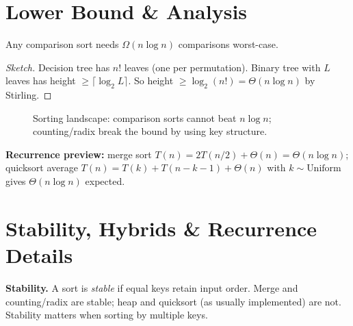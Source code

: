 \section{Lower Bound \& Analysis}
\label{sec:lower-bound}
\begin{theorem}
Any comparison sort needs $\Omega(n\log n)$ comparisons worst-case.
\end{theorem}
\begin{proof}[Sketch]
Decision tree has $n!$ leaves (one per permutation). Binary tree with $L$ leaves has height $\ge\lceil\log_{2}L\rceil$. So height $\ge\log_{2}(n!)=\Theta(n\log n)$ by Stirling.
\end{proof}

\begin{figure}[h]
\centering
{}
\caption{Sorting landscape: comparison sorts cannot beat $n\log n$; counting/radix break the bound by using key structure.}
\label{fig:sorting-landscape}
\end{figure}

\textbf{Recurrence preview:} merge sort $T(n)=2T(n/2)+\Theta(n)=\Theta(n\log n)$; quicksort average $T(n)=T(k)+T(n-k-1)+\Theta(n)$ with $k\sim\text{Uniform}$ gives $\Theta(n\log n)$ expected.


\section{Stability, Hybrids \& Recurrence Details}
\label{sec:stability-hybrids}
\textbf{Stability.} A sort is \emph{stable} if equal keys retain input order. Merge and counting/radix are stable; heap and quicksort (as usually implemented) are not. Stability matters when sorting by multiple keys.

